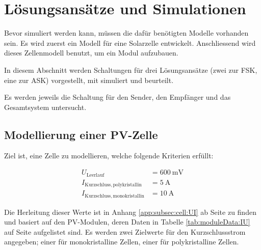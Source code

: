 \chapter{L\"osungsans\"atze und Simulationen}
\label{chap:simu}

Bevor  simuliert  werden  kann,  m\"ussen  die  daf\"ur  ben\"otigten  Modelle
vorhanden sein. Es  wird zuerst ein  Modell f\"ur eine  Solarzelle entwickelt.
Anschliessend wird dieses Zellenmodell benutzt, um ein Modul aufzubauen.

In  diesem Abschnitt  werden Schaltungen  f\"ur drei  L\"osungsans\"atze (zwei
zur  FSK, eine  zur  ASK)  vorgestellt, mit   simuliert  und
beurteilt.

Es werden  jeweils die  Schaltung f\"ur  den Sender,  den Empf\"anger  und das
Gesamtsystem untersucht.


\section{Modellierung einer PV-Zelle}
\label{sec:simu:model:cell}


Ziel ist, eine Zelle zu modellieren, welche folgende Kriterien erf\"ullt:

\begin{align}
    \label{eq:diode:ULeerlauf}
    U_{\mathrm{Leerlauf}}                    &= \SI{600}{\milli\volt} \\
    \label{eq:diode:IKurzschluss:polyk}
    I_{\mathrm{Kurzschluss, polykristallin}} &=  \SI{5}{\ampere}      \\
    \label{eq:diode:IKurzschluss:monok}
    I_{\mathrm{Kurzschluss, monokristallin}} &= \SI{10}{\ampere}
\end{align}

Die Herleitung  dieser Werte ist  in Anhang \ref{app:subsec:cell:UI}  ab Seite
\pageref{app:subsec:cell:UI} zu  finden und basiert auf  den PV-Modulen, deren
Daten in Tabelle \ref{tab:moduleData:IU} auf Seite \pageref{tab:moduleData:IU}
aufgelistet  sind.   Es  werden  zwei  Zielwerte  f\"ur  den  Kurzschlussstrom
angegeben;  einer f\"ur  monokristalline Zellen,  einer f\"ur  polykristalline
Zellen.

